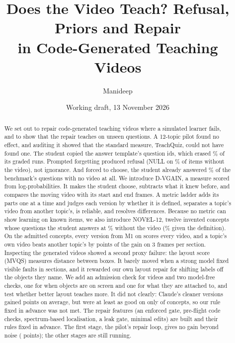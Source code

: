 \documentclass[10pt,twocolumn]{article}
\title{Does the Video Teach? Refusal, Priors and Repair\\in Code-Generated Teaching Videos}
\author{Manideep}
\date{Working draft, 13 November 2026}
\begin{document}
\maketitle

\begin{abstract}
We set out to repair code-generated teaching videos where a simulated learner fails, and to show that the repair
teaches on unseen questions. A 12-topic pilot found no effect, and auditing it showed that the standard measure,
TeachQuiz, could not have found one. The student copied the answer template's question ids, which erased
\OrderShare\% of its graded runs. Prompted forgetting produced refusal (NULL on \NullNoVideo\% of items without the
video), not ignorance. And forced to choose, the student already answered \mmmcpriorGemmaAcc\% of the benchmark's
questions with no video at all. We introduce D-VGAIN, a measure scored from log-probabilities. It makes the student choose,
subtracts what it knew before, and compares the moving video with its start and end frames. A metric ladder adds its parts one at a time and judges each version by whether it is
defined, separates a topic's video from another topic's, is reliable, and resolves differences. Because no metric can
show learning on known items, we also introduce NOVEL-12, twelve invented concepts whose questions the student
answers at \novelpriorGemmaAcc\% without the video (\novelcardGemmaAcc\% given the definition). On the
\LadNovelTopics{} admitted concepts, every version from M1 on scores every video, and a topic's own video beats
another topic's by \LadNovelSepNine{} points of the gain on 3 frames per section. Inspecting the generated videos
showed a second proxy failure: the layout score (MVQS) measures distance between boxes. It barely moved when a strong
model fixed \ClaudeFaults{} visible faults in \ClaudeSections{} sections, and it rewarded our own layout repair for
shifting labels off the objects they name. We add an admission check for videos and two model-free checks, one for
when objects are on screen and one for what they are attached to, and test whether better layout teaches more. It did not clearly: Claude's cleaner versions
gained \LSDiff{} points on average, but were at least as good on only \LSWins{} of \LSN{} concepts, so our rule fixed in advance
was not met. The
repair features (an enforced gate, pre-flight code checks, spectrum-based localisation, a leak gate, minimal edits)
are built and their rules fixed in advance. The first stage, the pilot's repair loop, gives no gain beyond noise
(\NMRepair{} points); the other stages are still running.
\end{abstract}














\end{document}

